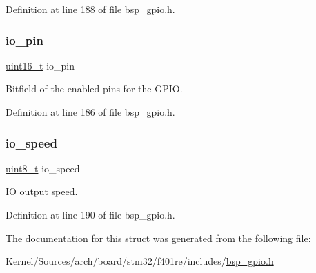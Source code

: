 Definition at line 188 of file bsp\+\_\+gpio.\+h.

\mbox{\label{struct_g_p_i_o___s_e_t_t_i_n_g_s_aad1e743ccf6e6bc276e61f9ba35bdfd0}} 
\subsubsection{\texorpdfstring{io\+\_\+pin}{io\_pin}}
{\footnotesize\ttfamily \hyperlink{stdint_8h_a273cf69d639a59973b6019625df33e30}{uint16\+\_\+t} io\+\_\+pin}



Bitfield of the enabled pins for the G\+P\+IO. 



Definition at line 186 of file bsp\+\_\+gpio.\+h.

\mbox{\label{struct_g_p_i_o___s_e_t_t_i_n_g_s_aee8d1e0b4f18b0a599ebcbc2e0c8b60f}} 
\subsubsection{\texorpdfstring{io\+\_\+speed}{io\_speed}}
{\footnotesize\ttfamily \hyperlink{stdint_8h_aba7bc1797add20fe3efdf37ced1182c5}{uint8\+\_\+t} io\+\_\+speed}



IO output speed. 



Definition at line 190 of file bsp\+\_\+gpio.\+h.



The documentation for this struct was generated from the following file\+:\begin{DoxyCompactItemize}
\item 
Kernel/\+Sources/arch/board/stm32/f401re/includes/\hyperlink{bsp__gpio_8h}{bsp\+\_\+gpio.\+h}\end{DoxyCompactItemize}
